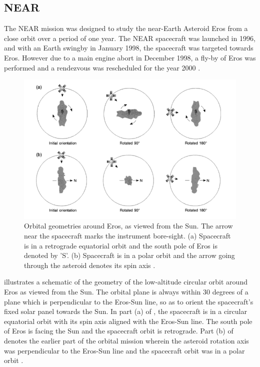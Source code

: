 \subsection{NEAR}
\label{Near}
The \gls{NEAR} mission was designed to study the near-Earth Asteroid Eros from a close orbit over a period of one year. The \gls{NEAR} spacecraft was launched in 1996, and with an Earth swingby in January 1998, the spacecraft was targeted towards Eros. However due to a main engine abort in December 1998, a fly-by of Eros was performed and a rendezvous was rescheduled for the year 2000 \cite{erosbook}.

\begin{figure}[h]
\centering
\captionsetup{justification=centering}
\includegraphics[scale=0.6]{nearerosbook.png}
\caption{Orbital geometries around Eros, as viewed from the Sun. The arrow near the spacecraft marks the instrument bore-sight. (a) Spacecraft is in a retrograde equatorial orbit and the south pole of Eros is denoted by 'S'. (b) Spacecraft is in a polar orbit and the arrow going through the asteroid denotes its spin axis \cite{erosbook}.}
\label{fig:nearerosbook}
\end{figure}

 illustrates a schematic of the geometry of the low-altitude circular orbit around Eros as viewed from the Sun. The orbital plane is always within 30 degrees of a plane which is perpendicular to the Eros-Sun line, so as to orient the spacecraft's fixed solar panel towards the Sun. In part (a) of , the spacecraft is in a circular equatorial orbit with its spin axis aligned with the Eros-Sun line. The south pole of Eros is facing the Sun and the spacecraft orbit is retrograde. Part (b) of  denotes the earlier part of the orbital mission wherein the asteroid rotation axis was perpendicular to the Eros-Sun line and the spacecraft orbit was in a polar orbit \cite{erosbook}.

